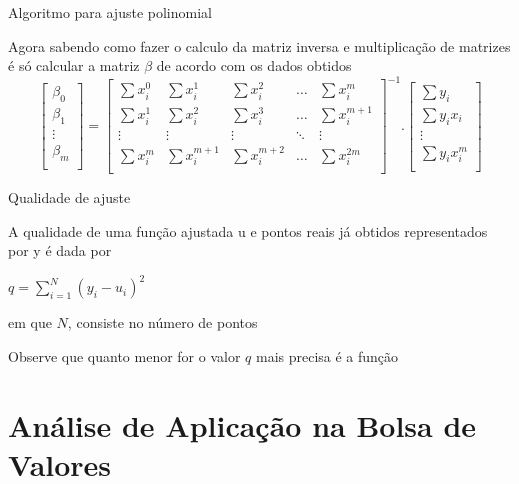 \documentclass[10pt]{beamer}
\begin{document}
\begin{frame}{Algoritmo para ajuste polinomial}

  Agora sabendo como fazer o calculo da matriz inversa e multiplicação de matrizes é só calcular a matriz $\beta$ de acordo com os dados obtidos
  \[
    \begin{bmatrix}
      \beta_0 \\
      \beta_1 \\
      \vdots  \\
      \beta_m \\
    \end{bmatrix}
    =
    \begin{bmatrix}
      \sum{x_{i}^{0}} & \sum{x_{i}^{1}} & \sum{x_{i}^{2}} & \dots  & \sum{x_{i}^{m}} \\
      \sum{x_{i}^{1}} & \sum{x_{i}^{2}} & \sum{x_{i}^{3}} & \dots & \sum{x_{i}^{m+1}}\\
      \vdots & \vdots & \vdots & \ddots & \vdots \\
      \sum{x_{i}^{m}} & \sum{x_{i}^{m+1}} & \sum{x_{i}^{m+2}} & \dots  & \sum{x_{i}^{2m}} \\
    \end{bmatrix}^{-1}
    .
    \begin{bmatrix}
      \sum{y_{i}} \\
      \sum{y_{i}x_{i}}\\
      \vdots \\
      \sum{y_{i}x_{i}^{m}} \\
    \end{bmatrix}
  \]
\end{frame}

\begin{frame}{Qualidade de ajuste}

    A qualidade de uma função ajustada u e pontos reais já obtidos representados por y é dada por
    \begin{center}
        $q = \sum_{i=1}^{N} (y_{i}-u_{i})^{2}$
    \end{center}
    em que $N$, consiste no número de pontos
    
    Observe que quanto menor for o valor $q$ mais precisa é a função
\end{frame}

\section{Análise de Aplicação na Bolsa de Valores}
\end{document}
